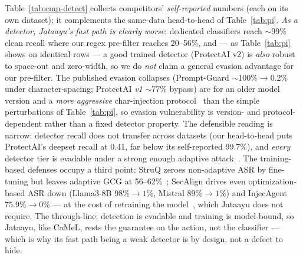 \documentclass[11pt]{article}
\begin{document}
Table~\ref{tab:cmp-detect} collects competitors' \emph{self-reported} numbers (each on its own
dataset); it complements the same-data head-to-head of Table~\ref{tab:pi}. \emph{As a detector,
Jataayu's fast path is clearly worse}: dedicated classifiers reach $\sim$99\% clean recall where our
regex pre-filter reaches 20--56\%, and --- as Table~\ref{tab:pi} shows on identical rows --- a good
trained detector (ProtectAI v2) is \emph{also} robust to space-out and zero-width, so we do
\emph{not} claim a general evasion advantage for our pre-filter. The published evasion collapses
(Prompt-Guard $\sim$100\%$\to$0.2\% under character-spacing; ProtectAI \emph{v1} $\sim$77\% bypass)
are for an older model version and a \emph{more aggressive} char-injection protocol~\cite{guardrails}
than the simple perturbations of Table~\ref{tab:pi}, so evasion vulnerability is version- and
protocol-dependent rather than a fixed detector property. The defensible reading is narrow: detector recall does not transfer across datasets (our
head-to-head puts ProtectAI's deepset recall at 0.41, far below its self-reported 99.7\%), and
\emph{every} detector tier is evadable under a strong enough adaptive attack~\cite{firewalls}. The
training-based defenses occupy a third point: StruQ zeroes non-adaptive ASR by fine-tuning but leaves
adaptive GCG at 56--62\%~\cite{struq}; SecAlign drives even optimization-based ASR down (Llama3-8B
$98\%\to1\%$, Mistral $89\%\to1\%$) and InjecAgent $75.9\%\to0\%$ --- at the cost of retraining the
model~\cite{secalign}, which Jataayu does not require. The through-line: detection is evadable and
training is model-bound, so Jataayu, like CaMeL, rests the guarantee on the action, not the
classifier --- which is why its fast path being a weak detector is by design, not a defect to hide.
\end{document}
